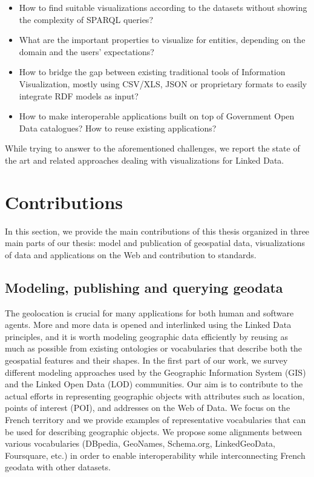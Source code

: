 \begin{itemize}
\item  How to find suitable visualizations according to the datasets without showing the complexity of SPARQL queries?
 \item  What are the important properties to visualize for entities, depending on the domain and the users' expectations?
 \item  How to bridge the gap between existing traditional tools of Information Visualization, mostly using CSV/XLS, JSON or proprietary formats to easily integrate RDF models as input?
 \item How to make interoperable applications built on top of Government Open Data catalogues? How to reuse existing applications?
\end{itemize}
 
 While trying to answer to the aforementioned challenges, we report the state of the art and related approaches dealing with visualizations for Linked Data. 


\section{Contributions}
\label{sec:contributions}
In this section, we provide the main contributions of this thesis organized in three main parts of our thesis: model and publication of geospatial data, visualizations of data and applications on the Web and contribution to standards. 

\subsection{Modeling, publishing and querying geodata}
The geolocation is crucial for many applications for both human and software agents. More and more data is opened and interlinked using the Linked Data principles, and it is worth modeling geographic data efficiently by reusing as much as possible from existing ontologies or vocabularies that describe both the geospatial features and their shapes. In the first part of our work, we survey different modeling approaches used by the Geographic Information System (GIS) and the Linked Open Data (LOD) communities. Our aim is to contribute to the actual efforts in representing geographic objects with attributes such as location, points of interest (POI), and addresses on the Web of Data. We focus on the French territory and we provide examples of representative vocabularies that can be used for describing geographic objects. We propose some alignments between various vocabularies (DBpedia, GeoNames, Schema.org, LinkedGeoData, Foursquare, etc.) in order to enable interoperability while interconnecting French geodata with other datasets. 

